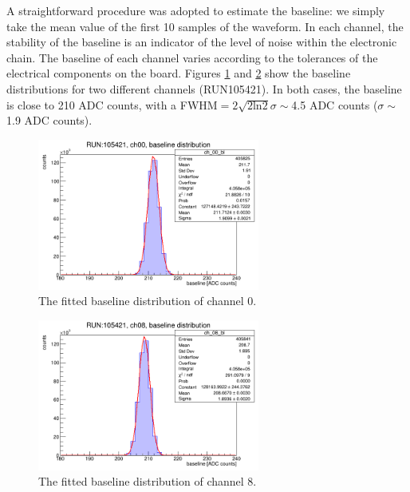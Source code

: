 A straightforward procedure was adopted to estimate the baseline: 
we simply take the mean value of the first 
10 samples of the waveform. 
In each channel, the stability of the 
baseline is an indicator of the 
level of noise within the electronic chain. 
The baseline of each channel varies 
according to the tolerances of 
the electrical components on the board.
Figures \ref{fig:baseline1} and \ref{fig:baseline2} 
show the baseline distributions for two different channels (RUN105421).
In both cases, the baseline is close to 
210 ADC counts, with a 
FWHM$=2 \sqrt{2 \text{ln}2}\sigma\sim$4.5 
ADC counts ($\sigma \sim$1.9 ADC counts).
  \begin{figure}[!h]
      \centering
      \includegraphics[width=0.65\textwidth]{figures/png/baseline_ch00.png}
      \caption[The fitted baseline distribution of channel 0.]{The fitted baseline distribution of channel 0.}
      \label{fig:baseline1}
  \end{figure}
  \begin{figure}[!h]
      \centering
      \includegraphics[width=0.65\textwidth]{figures/png/baseline_ch08.png}
      \caption[The fitted baseline distribution of channel 8.]{The fitted baseline distribution of channel 8.}
      \label{fig:baseline2}
\end{figure}

